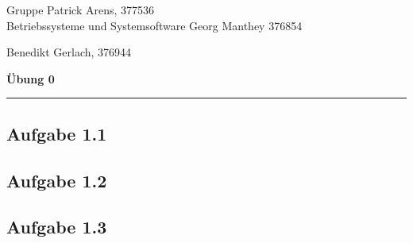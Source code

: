 \documentclass[a4paper,graphics,11pt]{article}
\newcommand{\aufgabe}[1]{\subsection*{Aufgabe #1}}
\begin{document}
    \noindent Gruppe              \hfill Patrick Arens, 377536\\
    \noindent Betriebssysteme und Systemsoftware    \hfill Georg Manthey 376854\\
    \strut\hfill Benedikt Gerlach, 376944\\
    \begin{center}
        \LARGE{\textbf{Übung 0}}
    \end{center}
    \begin{center}
    \rule[0.1ex]{\textwidth}{1pt}
    \end{center}
    
    \aufgabe{1.1}

    \aufgabe{1.2}

    

    \aufgabe{1.3}
    
    
\end{document}
